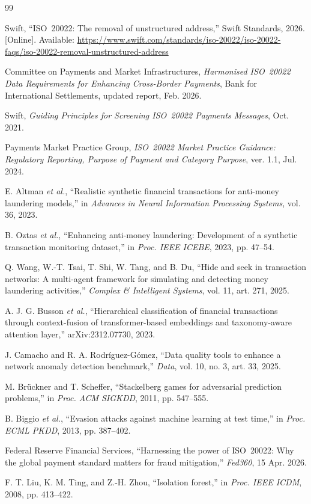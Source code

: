 \documentclass[conference]{IEEEtran}
\begin{document}
\balance
\begin{thebibliography}{99}
\scriptsize
\setlength{\itemsep}{0pt plus 0.2pt}

Swift, ``ISO~20022: The removal of unstructured address,'' Swift Standards,
2026. [Online]. Available:
\url{https://www.swift.com/standards/iso-20022/iso-20022-faqs/iso-20022-removal-unstructured-address}

Committee on Payments and Market Infrastructures, \emph{Harmonised ISO~20022
Data Requirements for Enhancing Cross-Border Payments}, Bank for International
Settlements, updated report, Feb. 2026.

Swift, \emph{Guiding Principles for Screening ISO~20022 Payments Messages},
Oct. 2021.

Payments Market Practice Group, \emph{ISO~20022 Market Practice Guidance:
Regulatory Reporting, Purpose of Payment and Category Purpose}, ver. 1.1, Jul.
2024.

E. Altman \emph{et al.}, ``Realistic synthetic financial transactions for
anti-money laundering models,'' in \emph{Advances in Neural Information
Processing Systems}, vol. 36, 2023.

B. Oztas \emph{et al.}, ``Enhancing anti-money laundering: Development of a
synthetic transaction monitoring dataset,'' in \emph{Proc. IEEE ICEBE}, 2023,
pp. 47--54.

Q. Wang, W.-T. Tsai, T. Shi, W. Tang, and B. Du, ``Hide and seek in
transaction networks: A multi-agent framework for simulating and detecting
money laundering activities,'' \emph{Complex \& Intelligent Systems}, vol. 11,
art. 271, 2025.

A. J. G. Busson \emph{et al.}, ``Hierarchical classification of financial
transactions through context-fusion of transformer-based embeddings and
taxonomy-aware attention layer,'' arXiv:2312.07730, 2023.

J. Camacho and R. A. Rodr\'iguez-G\'omez, ``Data quality tools to enhance a
network anomaly detection benchmark,'' \emph{Data}, vol. 10, no. 3, art. 33,
2025.

M. Br\"uckner and T. Scheffer, ``Stackelberg games for adversarial prediction
problems,'' in \emph{Proc. ACM SIGKDD}, 2011, pp. 547--555.

B. Biggio \emph{et al.}, ``Evasion attacks against machine learning at test
time,'' in \emph{Proc. ECML PKDD}, 2013, pp. 387--402.

Federal Reserve Financial Services, ``Harnessing the power of ISO~20022: Why
the global payment standard matters for fraud mitigation,'' \emph{Fed360}, 15
Apr. 2026.

F. T. Liu, K. M. Ting, and Z.-H. Zhou, ``Isolation forest,'' in \emph{Proc.
IEEE ICDM}, 2008, pp. 413--422.

\end{thebibliography}
\end{document}
